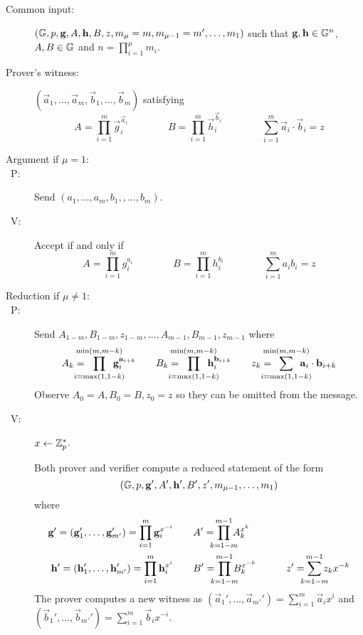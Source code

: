 \begin{description}
\item[Common input:] $(\mathbb{G},p,\mathbf{g},A,\mathbf{h},B,z,m_{\mu}=m,m_{\mu-1}=m',\ldots,m_1)$ such that $\mathbf{g},\mathbf{h} \in \mathbb{G}^n$, $A,B \in \mathbb{G}$ and $n=\prod_{i=1}^{\mu} m_i  $. %
\item[Prover's witness:] $(\vec{a}_1,\ldots,\vec{a}_m,\vec{b}_1,\ldots,\vec{b}_m)$ satisfying $$A=\prod_{i=1}^m\vec{g}_i^{\vec{a}_i} \qquad \qquad B=\prod_{i=1}^m\vec{h}_i^{\vec{b}_i} \qquad \qquad \sum_{i=1}^m\vec{a}_i\cdot\vec{b}_i=z$$
\item[Argument if $\mu=1$:]
\item[\ P:] Send $(a_1,\ldots,a_m,b_1,,\ldots,b_m)$.
\item[\ V:] Accept if and only if $$A=\prod_{i=1}^mg_i^{a_i} \qquad \qquad B=\prod_{i=1}^mh_i^{b_i} \qquad \qquad \sum_{i=1}^ma_ib_i=z$$
\item[Reduction if $\mu\neq 1$:]
\item[\ P:] Send $A_{1-m},B_{1-m},z_{1-m},\ldots,A_{m-1},B_{m-1},z_{m-1}$ where $$A_k=\mkern-24mu \prod_{i=\max(1,1-k)}^{\min(m,m-k)}\mkern-24mu\vec{g}_i^{\vec{a}_{i+k}} \qquad B_k=\mkern-24mu \prod_{i=\max(1,1-k)}^{\min(m,m-k)}\mkern-24mu\vec{h}_i^{\vec{b}_{i+k}} \qquad z_k=\mkern-24mu\sum_{i=\max(1,1-k)}^{\min(m,m-k)}\mkern-24mu\vec{a}_i\cdot \vec{b}_{i+k}$$ Observe $A_0=A, B_0=B, z_0=z$ so they can be omitted from the message.
\item[\ V:] $x\gets \mathbb{Z}_p^*$.

Both prover and verifier compute a reduced statement of the form $$(\mathbb{G},p,\mathbf{g}',A',\mathbf{h}',B',z',m_{\mu-1},\ldots,m_1)$$ where
\begin{align*}
\vec{g}'=(\vec{g}_1',\ldots,\vec{g}_{m'}')=\prod_{i=1}^m\vec{g}_i^{x^{-i}} & \qquad A'=\mkern-12mu\prod_{k=1-m}^{m-1}\mkern-12muA_k^{x^{k}} & \\
\vec{h}'=(\vec{h}_1',\ldots,\vec{h}_{m'}')=\prod_{i=1}^m\vec{h}_i^{x^{i}} & \qquad B'=\mkern-12mu\prod_{k=1-m}^{m-1}\mkern-12muB_k^{x^{-k}} & \qquad z'=\mkern-12mu\sum_{k=1-m}^{m-1}\mkern-12mu z_kx^{-k}
\end{align*} 
The prover computes a new witness as $(\vec{a}_1',\ldots,\vec{a}_{m'}')=\sum_{i=1}^m\vec{a}_ix^i$ and $(\vec{b}_1',\ldots,\vec{b}_{m'}')=\sum_{i=1}^m\vec{b}_ix^{-i}$.
\end{description}


